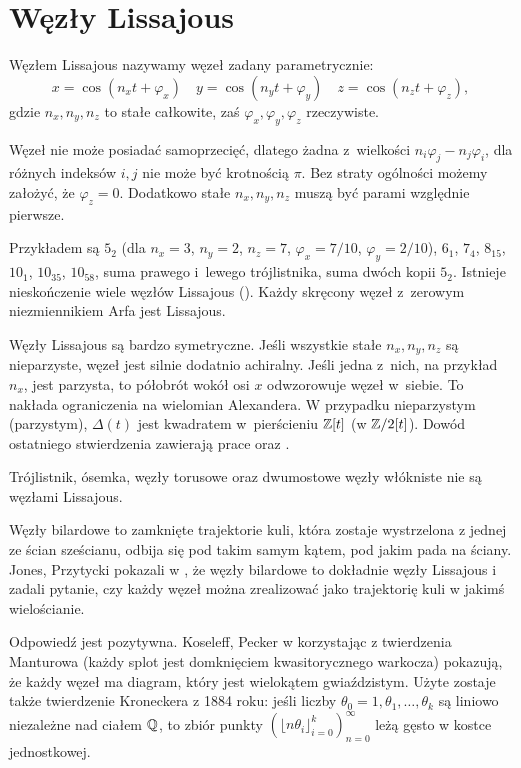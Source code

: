 \section{Węzły Lissajous} %
\label{sec:lissajous}

\begin{definition}
    Węzłem Lissajous nazywamy węzeł zadany parametrycznie:
    \[
        x = \cos(n_xt + \varphi_x) \quad
        y = \cos(n_yt + \varphi_y) \quad
        z = \cos(n_zt + \varphi_z),
    \]
    gdzie $n_x, n_y, n_z$ to stałe całkowite, zaś $\varphi_x, \varphi_y, \varphi_z$ rzeczywiste.
\end{definition}

Węzeł nie może posiadać samoprzecięć, dlatego żadna z~wielkości $n_i\varphi_j-n_j\varphi_i$, dla różnych indeksów $i, j$ nie może być krotnością $\pi$.
Bez straty ogólności możemy założyć, że $\varphi_z = 0$.
Dodatkowo stałe $n_x, n_y, n_z$ muszą być parami względnie pierwsze.

Przykładem są $5_2$ (dla $n_x = 3$, $n_y = 2$, $n_z = 7$, $\varphi_x = 7/10$, $\varphi_y = 2/10$), $6_1$, $7_4$, $8_{15}$, $10_1$, $10_{35}$, $10_{58}$, suma prawego i~lewego trójlistnika, suma dwóch kopii $5_2$.
Istnieje nieskończenie wiele węzłów Lissajous (\cite{lamm97}).
Każdy skręcony węzeł z~zerowym niezmiennikiem Arfa jest Lissajous.

Węzły Lissajous są bardzo symetryczne.
Jeśli wszystkie stałe $n_x, n_y, n_z$ są nieparzyste, węzeł jest silnie dodatnio achiralny.
Jeśli jedna z~nich, na przykład $n_x$, jest parzysta, to półobrót wokół osi $x$ odwzorowuje węzeł w~siebie.
To nakłada ograniczenia na wielomian Alexandera.
W przypadku nieparzystym (parzystym), $\Delta(t)$ jest kwadratem w~pierścieniu $\mathbb Z[t]$ (w $\mathbb Z/2[t]$).
Dowód ostatniego stwierdzenia zawierają prace \cite{hartley79} oraz \cite{murasugi71}.

\begin{corollary}
    Trójlistnik, ósemka, węzły torusowe oraz dwumostowe węzły włókniste nie są węzłami Lissajous.
\end{corollary}

Węzły bilardowe to zamknięte trajektorie kuli, która zostaje wystrzelona z jednej ze ścian sześcianu, odbija się pod takim samym kątem, pod jakim pada na ściany.
Jones, Przytycki pokazali w \cite{jones98}, że węzły bilardowe to dokładnie węzły Lissajous i zadali pytanie, czy każdy węzeł można zrealizować jako trajektorię kuli w jakimś wielościanie.

Odpowiedź jest pozytywna.
Koseleff, Pecker w \cite{koseleff14} korzystając z twierdzenia Manturowa (każdy splot jest domknięciem kwasitorycznego warkocza) pokazują, że każdy węzeł ma diagram, który jest wielokątem gwiaździstym.
Użyte zostaje także twierdzenie Kroneckera z 1884 roku: jeśli liczby $\theta_0 = 1, \theta_1, \ldots, \theta_k$ są liniowo niezależne nad ciałem $\mathbb Q$, to zbiór punkty $(\lfloor n\theta_i \rfloor_{i=0}^k)_{n=0}^\infty$ leżą gęsto w kostce jednostkowej.

